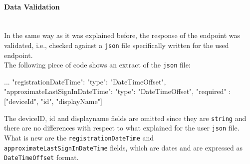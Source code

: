 \documentclass[12pt, a4paper, oneside]{article}
\begin{document}
\paragraph{Data Validation} ~\\
In the same way as it was explained before, the response of the endpoint was validated, i.e., checked against a \texttt{json} file specifically written for the used endpoint.\\
The following piece of code shows an extract of the \texttt{json} file:
\begin{python}
{
...
"registrationDateTime": {"type": "DateTimeOffset"},
"approximateLastSignInDateTime": {"type": "DateTimeOffset"},
"required" : ["deviceId", "id", "displayName"]
}
\end{python}
The deviceID, id and displayname fields are omitted since they are \texttt{string} and there are no differences with respect to what explained for the user \texttt{json} file.
What is new are the \texttt{registrationDateTime} and \\ \texttt{approximateLastSignInDateTime} fields, which are dates and are expressed as \texttt{DateTimeOffset} format.
\end{document}
